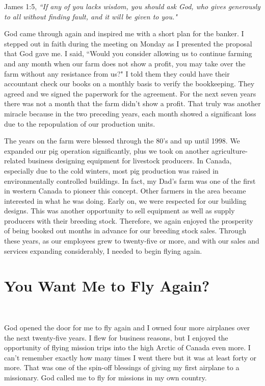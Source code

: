 \documentclass[oneside]{book}
\begin{document}
James 1:5, \textit{``If any of you lacks wisdom, you should ask God, who gives generously to all without finding fault, and it will be given to you."}

God came through again and inspired me with a short plan for the banker. I stepped out in faith during the meeting on Monday as I presented the proposal that God gave me. I said, ``Would you consider allowing us to continue farming and any month when our farm does not show a profit, you may take over the farm without any resistance from us?" I told them they could have their accountant check our books on a monthly basis to verify the bookkeeping. They agreed and we signed the paperwork for the agreement. For the next seven years there was not a month that the farm didn't show a profit. That truly was another miracle because in the two preceding years, each month showed a significant loss due to the repopulation of our production units.

The years on the farm were blessed through the 80's and up until 1998. We expanded our pig operation significantly, plus we took on another agriculture-related business designing equipment for livestock producers. In Canada, especially due to the cold winters, most pig production was raised in environmentally controlled buildings. In fact, my Dad's farm was one of the first in western Canada to pioneer this concept. Other farmers in the area became interested in what he was doing. Early on, we were respected for our building designs. This was another opportunity to sell equipment as well as supply producers with their breeding stock. Therefore, we again enjoyed the prosperity of being booked out months in advance for our breeding stock sales. Through these years, as our employees grew to twenty-five or more, and with our sales and services expanding considerably, I needed to begin flying again.


\section{You Want Me to Fly Again?}
\

God opened the door for me to fly again and I owned four more airplanes over the next twenty-five years. I flew for business reasons, but I enjoyed the opportunity of flying mission trips into the high Arctic of Canada even more. I can't remember exactly how many times I went there but it was at least forty or more. That was one of the spin-off blessings of giving my first airplane to a missionary. God called me to fly for missions in my own country. 
\end{document}
